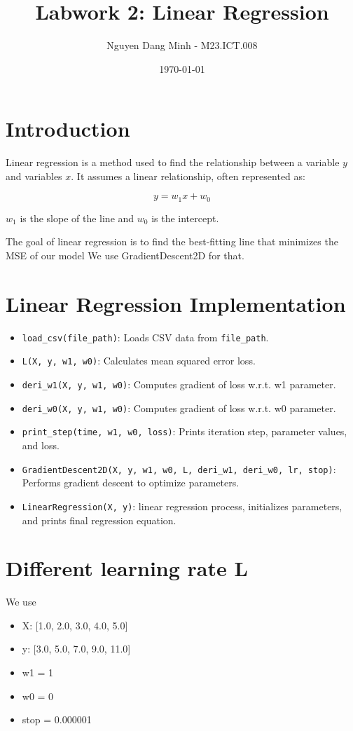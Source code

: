 \documentclass{article}
\title{Labwork 2: Linear Regression}
\author{Nguyen Dang Minh - M23.ICT.008}
\date{\today}
\begin{document}
\maketitle

\section{Introduction}

Linear regression is a method used to find the relationship between a variable \( y \) and variables \( x \). It assumes a linear relationship, often represented as:

\[ y = w_1x + w_0 \]

\( w_1 \) is the slope of the line and \( w_0 \) is the intercept. 

The goal of linear regression is to find the best-fitting line that minimizes the MSE of our model 
We use GradientDescent2D for that.

\section{Linear Regression Implementation}

\begin{itemize}
    \item \texttt{load\_csv(file\_path)}: Loads CSV data from \texttt{file\_path}.
    \item \texttt{L(X, y, w1, w0)}: Calculates mean squared error loss.
    \item \texttt{deri\_w1(X, y, w1, w0)}: Computes gradient of loss w.r.t. w1 parameter.
    \item \texttt{deri\_w0(X, y, w1, w0)}: Computes gradient of loss w.r.t. w0 parameter.
    \item \texttt{print\_step(time, w1, w0, loss)}: Prints iteration step, parameter values, and loss.
    \item \texttt{GradientDescent2D(X, y, w1, w0, L, deri\_w1, deri\_w0, lr, stop)}: Performs gradient descent to optimize parameters.
    \item \texttt{LinearRegression(X, y)}: linear regression process, initializes parameters, and prints final regression equation.
\end{itemize}

\section{Different learning rate L}
We use 
\begin{itemize}
    \item X: [1.0, 2.0, 3.0, 4.0, 5.0]
    \item y: [3.0, 5.0, 7.0, 9.0, 11.0]
    \item w1 = 1
    \item w0 = 0
    \item stop = 0.000001
\end{itemize}
\end{document}
